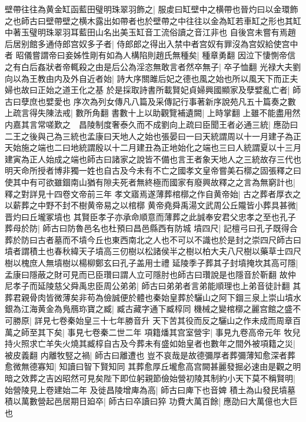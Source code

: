 壁帶往往為黄金缸函藍田璧明珠翠羽飾之|{
	服䖍曰缸壁中之横帶也晉灼曰以金環飾之也師古曰壁帶壁之横木露出如帶者也於壁帶之中往往以金為缸若車缸之形也其缸中著玉璧明珠翠羽耳藍田山名出美玉缸音工流俗讀之音江非也}
自後宫未嘗有焉趙后居别館多通侍郎宫奴多子者|{
	侍郎郎之得出入禁中者宫奴有罪沒為宫奴給使宫中者}
昭儀嘗謂帝曰妾姊性剛有如為人構陷則趙氏無種矣|{
	種章勇翻}
因泣下悽惻帝信之有白后姦狀者帝輒殺之由是后公為淫恣無敢言者然卒無子|{
	卒子恤翻}
光禄大夫劉向以為王教由内及外自近者始|{
	詩大序關雎后妃之德也風之始也所以風天下而正夫婦也故曰正始之道王化之基}
於是採取詩書所載賢妃貞婦興國顯家及孽嬖亂亡者|{
	師古曰孽庶也嬖愛也}
序次為列女傳凡八篇及采傳記行事著新序說苑凡五十篇奏之數上疏言得失陳法戒|{
	數所角翻}
書數十上以助觀覽補遺闕|{
	上時掌翻}
上雖不能盡用然内嘉其言常嗟歎之　昌陵制度奢泰久而不成劉向上疏曰臣聞王者必通三統|{
	應劭曰二王之後與己為三統也孟康曰天地人之始也張晏曰一曰天統謂周以十一月建子為正天始施之端也二曰地統謂殷以十二月建丑為正地始化之端也三曰人統謂夏以十三月建寅為正人始成之端也師古曰諸家之說皆不備也言王者象天地人之三統故存三代也}
明天命所授者博非獨一姓也自古及今未有不亡之國孝文皇帝嘗美石槨之固張釋之曰使其中有可欲雖錮南山猶有隙夫死者無終極而國家有廢興故釋之之言為無窮計也|{
	釋之對詳見十四卷文帝前三年}
孝文寤焉遂薄葬棺槨之作自黄帝始|{
	古之葬者厚衣之以薪葬之中野不封不樹黄帝易之以棺槨}
黄帝堯舜禹湯文武周公丘隴皆小葬具甚微|{
	晋灼曰丘壠冢墳也}
其賢臣孝子亦承命順意而薄葬之此誠奉安君父忠孝之至也孔子葬母於防|{
	師古曰防魯邑名也杜預曰昌邑縣西有防城}
墳四尺|{
	記檀弓曰孔子既得合葬於防曰古者墓而不墳今丘也東西南北之人也不可以不識也於是封之崇四尺師古曰墳者謂積土也春秋緯天子墳高三仞樹以松諸侯半之樹以柏大夫八尺樹以藥草士四尺樹以槐庶人無墳樹以楊柳鄭玄曰孔子盖用士禮}
延陵季子葬其子封墳掩坎其高可隱|{
	孟康曰隱蔽之財可見而已臣瓚曰謂人立可隱肘也師古曰瓚說是也隱音於靳翻}
故仲尼孝子而延陵慈父舜禹忠臣周公弟弟|{
	師古曰弟弟者言弟能順理也上弟音徒計翻}
其葬君親骨肉皆微薄矣非苟為儉誠便於體也秦始皇葬於驪山之阿下錮三泉上崇山墳水銀為江海黄金為鳬鴈珎寶之臧|{
	臧古藏字通下臧椁同}
機械之變棺槨之麗宫館之盛不可勝原|{
	詳見七卷秦始皇三十七年勝音升}
天下苦其役而反之驪山之作未成而周章百萬之師至其下矣|{
	事見七卷秦二世二年}
項籍燔其宫室營宇|{
	事見九卷高帝元年}
牧兒持火照求亡羊失火燒其臧椁自古及今葬未有盛如始皇者也數年之間外被項籍之災|{
	被皮義翻}
内離牧竪之禍|{
	師古曰離遭也}
豈不哀哉是故德彌厚者葬彌薄知愈深者葬愈微無德寡知|{
	知讀曰智下賢知同}
其葬愈厚丘壠愈高宫闕甚麗發掘必速由是觀之明暗之效葬之吉凶昭然可見矣陛下即位躬親節儉始營初陵其制約小天下莫不稱賢明|{
	始營陵見上卷建始二年}
及徙昌陵增庳為高|{
	師古曰庳下也音婢}
積土為山發民墳墓積以萬數營起邑居期日廹卒|{
	師古曰卒讀曰猝}
功費大萬百餘|{
	應劭曰大萬億也大巨也}
